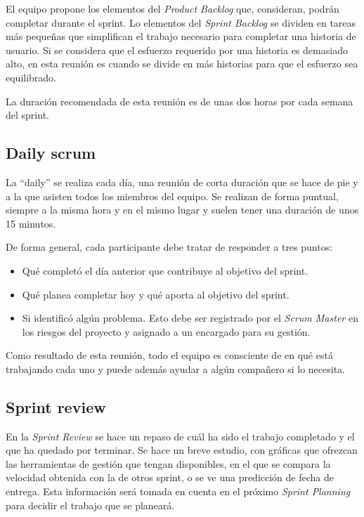 El equipo propone los elementos del \emph{Product Backlog} que, consideran, podrán completar durante el sprint. Lo elementos del \emph{Sprint Backlog} se dividen en tareas más pequeñas que simplifican el trabajo necesario para completar una historia de usuario. Si se considera que el esfuerzo requerido por una historia es demasiado alto, en esta reunión es cuando se divide en más historias para que el esfuerzo sea equilibrado.

La duración recomendada de esta reunión es de unas dos horas por cada semana del sprint.

\subsection{Daily scrum}
\label{daily}

La ``daily'' se realiza cada día, una reunión de corta duración que se hace de pie y a la que asisten todos los miembros del equipo. Se realizan de forma puntual, siempre a la misma hora y en el mismo lugar y suelen tener una duración de unos 15 minutos.

De forma general, cada participante debe tratar de responder a tres puntos:
\begin{itemize}
\item Qué completó el día anterior que contribuye al objetivo del sprint.
\item Qué planea completar hoy y qué aporta al objetivo del sprint.
\item Si identificó algún problema. Esto debe ser registrado por el \emph{Scrum Master} en los riesgos del proyecto y asignado a un encargado para su gestión.
\end{itemize}

Como resultado de esta reunión, todo el equipo es consciente de en qué está trabajando cada uno y puede además ayudar a algún compañero si lo necesita.

\subsection{Sprint review}
\label{sprintReview}

En la \emph{Sprint Review} se hace un repaso de cuál ha sido el trabajo completado y el que ha quedado por terminar. Se hace un breve estudio, con gráficas que ofrezcan las herramientas de gestión que tengan disponibles, en el que se compara la velocidad obtenida con la de otros sprint, o se ve una predicción de fecha de entrega. Esta información será tomada en cuenta en el próximo \emph{Sprint Planning} para decidir el trabajo que se planeará.

